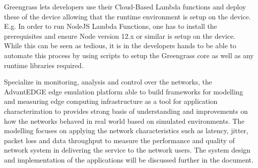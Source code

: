 Greengrass lets developers use their Cloud-Based Lambda functions and deploy these of the device allowing that the runtime environment is setup on the device. E.g. In order to run NodeJS Lambda Functions, one has to install the prerequisites and ensure Node version 12.x or similar is setup on the device. While this can be seen as tedious, it is in the developers hands to be able to automate this process by using scripts to setup the Greengrass core as well as any runtime libraries required.

Specialize in monitoring, analysis and control over the networks, the AdvantEDGE edge emulation platform able to build frameworks for modelling and measuring edge computing infrastructure as a tool for application characterization to provides strong basis of understanding and improvements on how the networks behaved in real world based on simulated environments. The modelling focuses on applying the network characteristics such as latency, jitter, packet loss and data throughput to measure the performance and quality of network system in delivering the service to the network users. The system design and implementation of the applications will be discussed further in the document.

